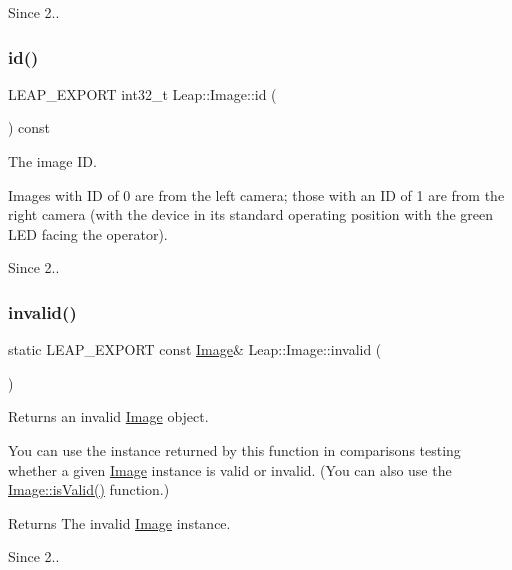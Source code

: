 \begin{DoxySince}{Since}
2.. 
\end{DoxySince}
\mbox{\label{class_leap_1_1_image_ab8a7baeb737b6f779d1ea47e0efaeb1d}} 
\subsubsection{\texorpdfstring{id()}{id()}}
{\footnotesize\ttfamily L\+E\+A\+P\+\_\+\+E\+X\+P\+O\+RT int32\+\_\+t Leap\+::\+Image\+::id (\begin{DoxyParamCaption}{ }\end{DoxyParamCaption}) const}

The image ID.

Images with ID of 0 are from the left camera; those with an ID of 1 are from the right camera (with the device in its standard operating position with the green L\+ED facing the operator).

\begin{DoxySince}{Since}
2.. 
\end{DoxySince}
\mbox{\label{class_leap_1_1_image_ab75d5df98401a07078e22916c828c0b5}} 
\subsubsection{\texorpdfstring{invalid()}{invalid()}}
{\footnotesize\ttfamily static L\+E\+A\+P\+\_\+\+E\+X\+P\+O\+RT const \hyperlink{class_leap_1_1_image}{Image}\& Leap\+::\+Image\+::invalid (\begin{DoxyParamCaption}{ }\end{DoxyParamCaption})\hspace{0.3cm}{\ttfamily [static]}}

Returns an invalid \hyperlink{class_leap_1_1_image}{Image} object.

You can use the instance returned by this function in comparisons testing whether a given \hyperlink{class_leap_1_1_image}{Image} instance is valid or invalid. (You can also use the \hyperlink{class_leap_1_1_image_a536cc04b3a40a5e3527ca45d894d57fd}{Image\+::is\+Valid()} function.)

\begin{DoxyReturn}{Returns}
The invalid \hyperlink{class_leap_1_1_image}{Image} instance. 
\end{DoxyReturn}
\begin{DoxySince}{Since}
2.. 
\end{DoxySince}
\mbox{\label{class_leap_1_1_image_a536cc04b3a40a5e3527ca45d894d57fd}} 
